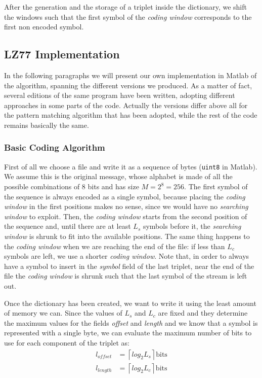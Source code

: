 After the generation and the storage of a triplet inside the dictionary, we shift the windows such that the first symbol of the \textit{coding window} corresponds to the first non encoded symbol.

\subsection{LZ77 Implementation} \label{subsec:lz77implem}
In the following paragraphs we will present our own implementation in Matlab of the algorithm, spanning the different versions we produced. As a matter of fact, several editions of the same program have been written, adopting different approaches in some parts of the code. Actually the versions differ above all for the pattern matching algorithm that has been adopted, while the rest of the code remains basically the same.

\subsubsection{Basic Coding Algorithm} \label{subsubsec:basiclz77}
First of all we choose a file and write it as a sequence of bytes (\texttt{uint8} in Matlab). We assume this is the original message, whose alphabet is made of all the possible combinations of $8$ bits and has size $M = 2^8 = 256$. The first symbol of the sequence is always encoded as a single symbol, because placing the \textit{coding window} in the first positions makes no sense, since we would have no \textit{searching window} to exploit. Then, the \textit{coding window} starts from the second position of the sequence and, until there are at least $L_s$ symbols before it, the \textit{searching window} is shrunk to fit into the available positions. The same thing happens to the \textit{coding window} when we are reaching the end of the file: if less than $L_c$ symbols are left, we use a shorter \textit{coding window}. Note that, in order to always have a symbol to insert in the \textit{symbol} field of the last triplet, near the end of the file the \textit{coding window} is shrunk such that the last symbol of the stream is left out.

Once the dictionary has been created, we want to write it using the least amount of memory we can. Since the values of $L_s$ and $L_c$ are fixed and they determine the maximum values for the fields \textit{offset} and \textit{length} and we know that a symbol is represented with a single byte, we can evaluate the maximum number of bits to use for each component of the triplet as:
\begin{align}
l_{offset} &= \left \lceil log_2L_s \right \rceil \text{bits} \\
l_{length} &= \left \lceil log_2L_c \right \rceil \text{bits} 
\end{align}


